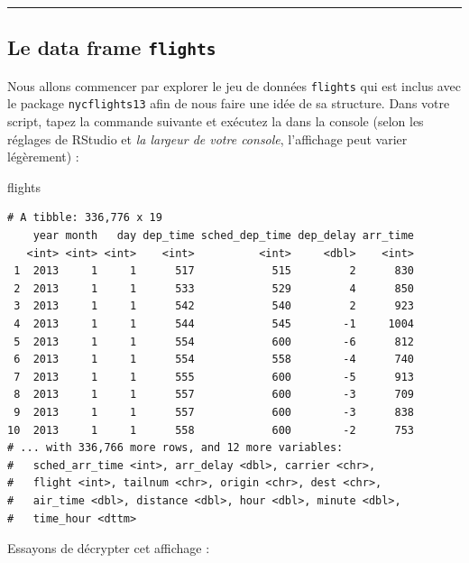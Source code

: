 \documentclass[
  a4paper,
]{article}
\newenvironment{Shaded}{\begin{snugshade}}{\end{snugshade}}
\newcommand{\NormalTok}[1]{\textcolor[rgb]{0.12,0.11,0.11}{#1}}
\begin{document}
\begin{center}\rule{0.5\linewidth}{0.5pt}\end{center}

\hypertarget{le-data-frame-flights}{%
\subsection{\texorpdfstring{Le data frame \texttt{flights}}{Le data frame flights}}\label{le-data-frame-flights}}

Nous allons commencer par explorer le jeu de données \texttt{flights} qui est inclus avec le package \texttt{nycflights13} afin de nous faire une idée de sa structure. Dans votre script, tapez la commande suivante et exécutez la dans la console (selon les réglages de RStudio et \emph{la largeur de votre console}, l'affichage peut varier légèrement) :

\begin{Shaded}
\begin{Highlighting}[]
\NormalTok{flights}
\end{Highlighting}
\end{Shaded}

\begin{verbatim}
# A tibble: 336,776 x 19
    year month   day dep_time sched_dep_time dep_delay arr_time
   <int> <int> <int>    <int>          <int>     <dbl>    <int>
 1  2013     1     1      517            515         2      830
 2  2013     1     1      533            529         4      850
 3  2013     1     1      542            540         2      923
 4  2013     1     1      544            545        -1     1004
 5  2013     1     1      554            600        -6      812
 6  2013     1     1      554            558        -4      740
 7  2013     1     1      555            600        -5      913
 8  2013     1     1      557            600        -3      709
 9  2013     1     1      557            600        -3      838
10  2013     1     1      558            600        -2      753
# ... with 336,766 more rows, and 12 more variables:
#   sched_arr_time <int>, arr_delay <dbl>, carrier <chr>,
#   flight <int>, tailnum <chr>, origin <chr>, dest <chr>,
#   air_time <dbl>, distance <dbl>, hour <dbl>, minute <dbl>,
#   time_hour <dttm>
\end{verbatim}

Essayons de décrypter cet affichage :
\end{document}

